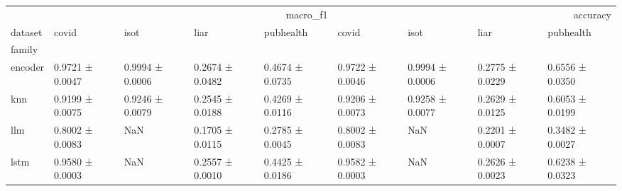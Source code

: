 \begin{tabular}{lllllllll}
\toprule
 & \multicolumn{4}{r}{macro_f1} & \multicolumn{4}{r}{accuracy} \\
dataset & covid & isot & liar & pubhealth & covid & isot & liar & pubhealth \\
family &  &  &  &  &  &  &  &  \\
\midrule
encoder & 0.9721 ± 0.0047 & 0.9994 ± 0.0006 & 0.2674 ± 0.0482 & 0.4674 ± 0.0735 & 0.9722 ± 0.0046 & 0.9994 ± 0.0006 & 0.2775 ± 0.0229 & 0.6556 ± 0.0350 \\
knn & 0.9199 ± 0.0075 & 0.9246 ± 0.0079 & 0.2545 ± 0.0188 & 0.4269 ± 0.0116 & 0.9206 ± 0.0073 & 0.9258 ± 0.0077 & 0.2629 ± 0.0125 & 0.6053 ± 0.0199 \\
llm & 0.8002 ± 0.0083 & NaN & 0.1705 ± 0.0115 & 0.2785 ± 0.0045 & 0.8002 ± 0.0083 & NaN & 0.2201 ± 0.0007 & 0.3482 ± 0.0027 \\
lstm & 0.9580 ± 0.0003 & NaN & 0.2557 ± 0.0010 & 0.4425 ± 0.0186 & 0.9582 ± 0.0003 & NaN & 0.2626 ± 0.0023 & 0.6238 ± 0.0323 \\
\bottomrule
\end{tabular}
